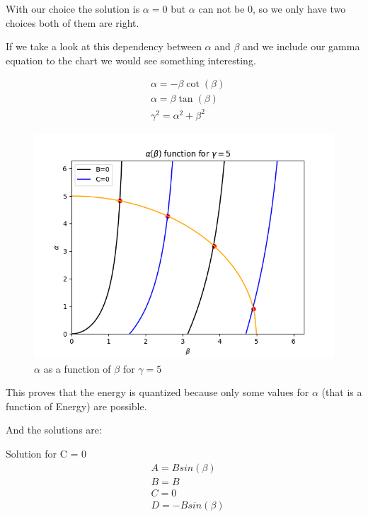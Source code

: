 With our choice the solution is $\alpha = 0$ but $\alpha$ can not be 0, so we only have two choices both of them are right.


If we take a look at this dependency between $\alpha$ and $\beta$ and we include our gamma equation to the chart we would see something interesting.

\begin{equation}
    \begin{split}
        & \alpha = -\beta \cot{(\beta)}
        \\
        & \alpha = \beta \tan{(\beta)}
        \\
        & \gamma^2 = \alpha^2 + \beta^2
    \end{split}
\end{equation}

\begin{figure}[H]
    \centering
    \includegraphics{images3/alpha_beta.png}
    \caption{$\alpha$ as a function of $\beta$ for $\gamma = 5$}
\end{figure}

This proves that the energy is quantized because only some values for $\alpha$ (that is a function of Energy) are possible.

And the solutions are:

Solution for C = 0
\begin{equation}
     \begin{split}
        & A = B sin(\beta)
        \\
        & B = B
        \\
        & C = 0
        \\
        & D = - B sin(\beta)
     \end{split}
\end{equation}


